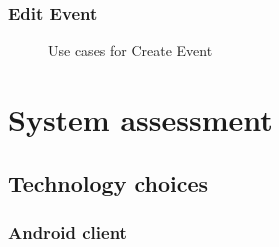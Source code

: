 \documentclass{article}
\begin{document}
		\subsubsection{Edit Event}
			\begin{figure}[H]
				\caption{Use cases for Create Event}
			\end{figure}
	
	\pagebreak
	
	\section{System assessment}	
	
		\subsection{Technology choices}
		
		\subsubsection{Android client}
		
\end{document}
